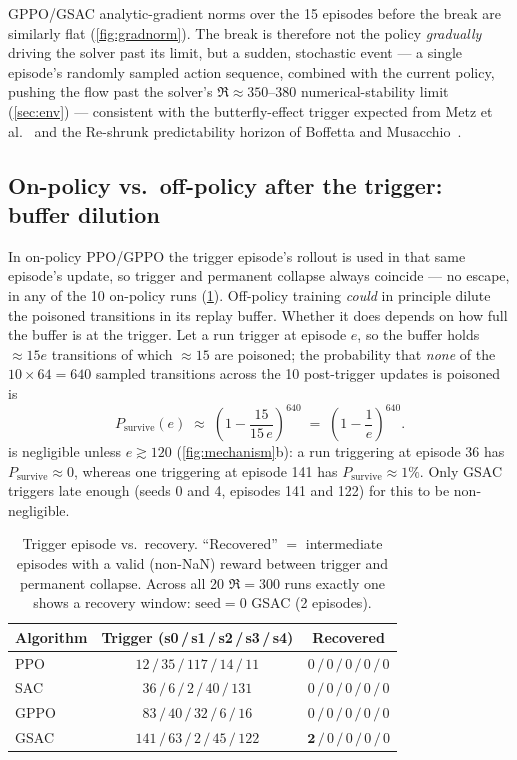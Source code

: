 GPPO/GSAC analytic-gradient norms over the 15 episodes before the break are
similarly flat (\cref{fig:gradnorm}). The break is therefore not the policy
\emph{gradually} driving the solver past its limit, but a sudden, stochastic
event --- a single episode's randomly sampled action sequence, combined with
the current policy, pushing the flow past the solver's $\Re\approx 350$--$380$
numerical-stability limit (\cref{sec:env}) --- consistent with the
butterfly-effect trigger expected from Metz et al.~\cite{metz2021} and the
Re-shrunk predictability horizon of Boffetta and Musacchio~\cite{boffetta2017}.

\subsection{On-policy vs.\ off-policy after the trigger: buffer dilution}
\label{sec:buffer}

In on-policy PPO/GPPO the trigger episode's rollout is used in that same
episode's update, so trigger and permanent collapse always coincide --- no
escape, in any of the 10 on-policy runs (\cref{tab:trigger}). Off-policy
training \emph{could} in principle dilute the poisoned transitions in its
replay buffer. Whether it does depends on how full the buffer is at the
trigger. Let a run trigger at episode $e$, so the buffer holds $\approx 15e$
transitions of which $\approx 15$ are poisoned; the probability that
\emph{none} of the $10\times 64 = 640$ sampled transitions across the 10
post-trigger updates is poisoned is
\begin{equation}
  P_{\text{survive}}(e)\;\approx\;\left(1-\frac{15}{15\,e}\right)^{640}
  \;=\;\left(1-\frac{1}{e}\right)^{640}.
  \label{eq:survive}
\end{equation}
 is negligible unless $e\gtrsim 120$ (\cref{fig:mechanism}b):
a run triggering at episode 36 has $P_{\text{survive}}\approx 0$, whereas one
triggering at episode 141 has $P_{\text{survive}}\approx 1\%$. Only GSAC
triggers late enough (seeds 0 and 4, episodes 141 and 122) for this to be
non-negligible.

\begin{table}[t]
\centering
\caption{Trigger episode vs.\ recovery. ``Recovered'' $=$ intermediate
episodes with a valid (non-NaN) reward between trigger and permanent
collapse. Across all 20 $\Re=300$ runs exactly one shows a recovery window:
$\text{seed}=0$ GSAC (2 episodes).}
\label{tab:trigger}
\small
\begin{tabular}{|l|c|c|}
\hline
Algorithm & Trigger (s0\,/\,s1\,/\,s2\,/\,s3\,/\,s4) & Recovered \\
\hline
PPO  & $12\,/\,35\,/\,117\,/\,14\,/\,11$   & $0\,/\,0\,/\,0\,/\,0\,/\,0$ \\
\hline
SAC  & $36\,/\,6\,/\,2\,/\,40\,/\,131$     & $0\,/\,0\,/\,0\,/\,0\,/\,0$ \\
\hline
GPPO & $83\,/\,40\,/\,32\,/\,6\,/\,16$     & $0\,/\,0\,/\,0\,/\,0\,/\,0$ \\
\hline
GSAC & $141\,/\,63\,/\,2\,/\,45\,/\,122$   & $\mathbf{2}\,/\,0\,/\,0\,/\,0\,/\,0$ \\
\hline
\end{tabular}
\end{table}

